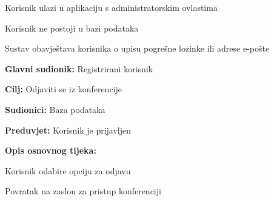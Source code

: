 \begin{packed_item}
\begin{packed_item}
\begin{packed_enum}
								\item Korisnik ulazi u aplikaciju s administratorskim ovlastima
								
							\end{packed_enum}
							
							\item[4.a] Korisnik ne postoji u bazi podataka
							\item[] \begin{packed_enum}
								
								\item Sustav obavještava korisnika o upisu pogrešne lozinke ili adrese e-pošte
								
							\end{packed_enum}
							
						\end{packed_item}
					\end{packed_item}
					
					\noindent {}
					\begin{packed_item}
						
						\item \textbf{Glavni sudionik: } Registrirani korisnik
						\item  \textbf{Cilj:} Odjaviti se iz konferencije
						\item  \textbf{Sudionici:} Baza podataka
						\item  \textbf{Preduvjet:} Korisnik je prijavljen
						\item  \textbf{Opis osnovnog tijeka:}
						
						\item[] \begin{packed_enum}
							
							\item Korisnik odabire opciju za odjavu
							\item Povratak na zaslon za pristup konferenciji
							
						\end{packed_enum}
					\end{packed_item}
					
